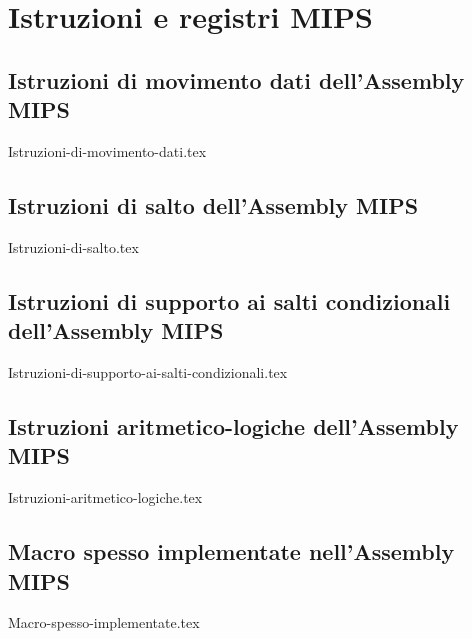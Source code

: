 



\chapter{Istruzioni e registri MIPS}
\section*{Istruzioni di movimento dati dell'Assembly MIPS}
\begin{table}[H]
	\centering
	{Istruzioni-di-movimento-dati.tex}
\end{table}

\section*{Istruzioni di salto dell'Assembly MIPS}
\begin{table}[H]
	\centering
	{Istruzioni-di-salto.tex}
\end{table}

\section*{Istruzioni di supporto ai salti condizionali dell'Assembly MIPS}
\begin{table}[H]
	\centering
	{Istruzioni-di-supporto-ai-salti-condizionali.tex}
\end{table}

\section*{Istruzioni aritmetico-logiche dell'Assembly MIPS}
\begin{table}[H]
	\centering
	{Istruzioni-aritmetico-logiche.tex}
\end{table}

\section*{Macro spesso implementate nell'Assembly MIPS}
\begin{table}[H]
	\centering
	{Macro-spesso-implementate.tex}
\end{table}

